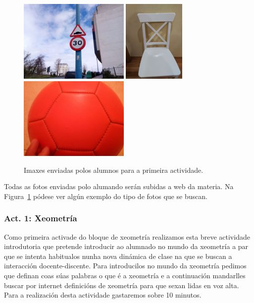 \begin{figure}[h!]
  \centering
  \includegraphics[height=4cm]{img/act0-1.jpg}
  \includegraphics[height=4cm]{img/act0-2.jpg}
  \includegraphics[height=4cm]{img/act0-3.jpg}
  \caption{Imaxes enviadas polos alumnos para a primeira actividade.}\label{fig:act0}
\end{figure}

Todas as fotos enviadas polo alumando serán subidas a web da materia. Na Figura~\ref{fig:act0} pódese ver algún exemplo do tipo de fotos que se buscan.

\subsubsection{Act. 1: Xeometría}
Como primeira activade do bloque de xeometría realizamos esta breve actividade introdutoria que pretende introducir ao alumnado no mundo da xeometría a par que se intenta habitualos nunha nova dinámica de clase na que se buscan a interacción docente-discente. Para introducilos no mundo da xeometría pedimos que definan coas súas palabras o que é a xeometría e a continuación mandarlles buscar por internet definicións de xeometría para que sexan lidas en voz alta. Para a realización desta actividade gastaremos sobre 10 minutos.

